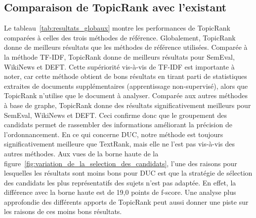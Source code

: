   \subsection{Comparaison de TopicRank avec l'existant}
  \label{subsec:comparaison_de_topicrank_avec_l_existant}
    Le tableau~\ref{tab:resultats_globaux} montre les performances de TopicRank
    comparées à celles des trois méthodes de référence.
    Globalement, TopicRank donne de meilleurs résultats que les méthodes de
    référence utilisées.
    Comparée à la méthode TF-IDF, TopicRank donne de meilleurs résultats pour
    SemEval, WikiNews et DEFT. Cette supériorité vis-à-vis de TF-IDF est
    importante à noter, car cette méthode obtient de bons résultats en tirant
    parti de statistiques extraites de documents supplémentaires (apprentissage
    non-supervisé), alors que TopicRank n'utilise que le document à analyser.
    Comparée aux autres méthodes à base de graphe, TopicRank donne des
    résultats significativement meilleurs pour SemEval, WikiNews et DEFT. Ceci
    confirme donc que le groupement des candidats permet de rassembler des
    informations améliorant la précision de l'ordonnancement. En ce qui concerne
    DUC, notre méthode est toujours significativement meilleure que TextRank,
    mais elle ne l'est pas vis-à-vis des autres méthodes. Aux vues de la borne
    haute de la figure~\ref{fig:variation_de_la_selection_des_candidats}, l'une
    des raisons pour lesquelles les résultats sont moins bons pour DUC est que
    la stratégie de sélection des candidats les plus représentatifs des sujets
    n'est pas adaptée. En effet, la différence avec la borne haute est de 19,0
    points de f-score. Une analyse plus approfondie des différents apports de
    TopicRank peut aussi donner une piste sur les raisons de ces moins bons
    résultats.
